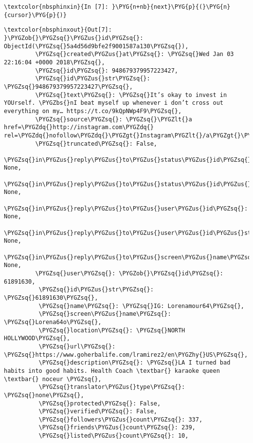 \documentclass[letterpaper,10pt,english]{sphinxmanual}
\begin{document}
%
\begin{Verbatim}[commandchars=\\\{\}]
\textcolor{nbsphinxin}{In [7]: }\PYG{n+nb}{next}\PYG{p}{(}\PYG{n}{cursor}\PYG{p}{)}
\end{Verbatim}

%
\begin{Verbatim}[commandchars=\\\{\}]
\textcolor{nbsphinxout}{Out[7]: }\PYGZob{}\PYGZsq{}\PYGZus{}id\PYGZsq{}: ObjectId(\PYGZsq{}5a4d56d9bfe2f9001587a130\PYGZsq{}),
         \PYGZsq{}created\PYGZus{}at\PYGZsq{}: \PYGZsq{}Wed Jan 03 22:16:04 +0000 2018\PYGZsq{},
         \PYGZsq{}id\PYGZsq{}: 948679379957223427,
         \PYGZsq{}id\PYGZus{}str\PYGZsq{}: \PYGZsq{}948679379957223427\PYGZsq{},
         \PYGZsq{}text\PYGZsq{}: \PYGZsq{}It’s okay to invest in YOUrself. \PYGZbs{}nI beat myself up whenever i don’t cross out everything on my… https://t.co/9kQpNWp4F9\PYGZsq{},
         \PYGZsq{}source\PYGZsq{}: \PYGZsq{}\PYGZlt{}a href=\PYGZdq{}http://instagram.com\PYGZdq{} rel=\PYGZdq{}nofollow\PYGZdq{}\PYGZgt{}Instagram\PYGZlt{}/a\PYGZgt{}\PYGZsq{},
         \PYGZsq{}truncated\PYGZsq{}: False,
         \PYGZsq{}in\PYGZus{}reply\PYGZus{}to\PYGZus{}status\PYGZus{}id\PYGZsq{}: None,
         \PYGZsq{}in\PYGZus{}reply\PYGZus{}to\PYGZus{}status\PYGZus{}id\PYGZus{}str\PYGZsq{}: None,
         \PYGZsq{}in\PYGZus{}reply\PYGZus{}to\PYGZus{}user\PYGZus{}id\PYGZsq{}: None,
         \PYGZsq{}in\PYGZus{}reply\PYGZus{}to\PYGZus{}user\PYGZus{}id\PYGZus{}str\PYGZsq{}: None,
         \PYGZsq{}in\PYGZus{}reply\PYGZus{}to\PYGZus{}screen\PYGZus{}name\PYGZsq{}: None,
         \PYGZsq{}user\PYGZsq{}: \PYGZob{}\PYGZsq{}id\PYGZsq{}: 61891630,
          \PYGZsq{}id\PYGZus{}str\PYGZsq{}: \PYGZsq{}61891630\PYGZsq{},
          \PYGZsq{}name\PYGZsq{}: \PYGZsq{}IG: Lorenamour64\PYGZsq{},
          \PYGZsq{}screen\PYGZus{}name\PYGZsq{}: \PYGZsq{}Lorena64o\PYGZsq{},
          \PYGZsq{}location\PYGZsq{}: \PYGZsq{}NORTH HOLLYWOOD\PYGZsq{},
          \PYGZsq{}url\PYGZsq{}: \PYGZsq{}https://www.goherbalife.com/lramirez2/en\PYGZhy{}US\PYGZsq{},
          \PYGZsq{}description\PYGZsq{}: \PYGZsq{}LA I turned bad habits into good habits. Health Coach \textbar{} karaoke queen \textbar{} noceur \PYGZsq{},
          \PYGZsq{}translator\PYGZus{}type\PYGZsq{}: \PYGZsq{}none\PYGZsq{},
          \PYGZsq{}protected\PYGZsq{}: False,
          \PYGZsq{}verified\PYGZsq{}: False,
          \PYGZsq{}followers\PYGZus{}count\PYGZsq{}: 337,
          \PYGZsq{}friends\PYGZus{}count\PYGZsq{}: 239,
          \PYGZsq{}listed\PYGZus{}count\PYGZsq{}: 10,

\end{Verbatim}
\end{document}

